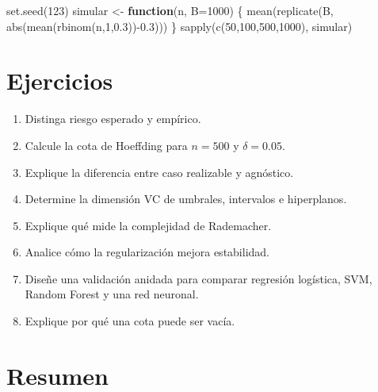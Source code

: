 \documentclass[
  spanish,
  10.5pt,
  letterpaper,
  DIV=11,
  numbers=noendperiod,
  oneside,
  open=any]{scrreprt}
\newenvironment{Shaded}{\begin{snugshade}}{\end{snugshade}}
\newcommand{\AttributeTok}[1]{\textcolor[rgb]{0.40,0.45,0.13}{#1}}
\newcommand{\ControlFlowTok}[1]{\textcolor[rgb]{0.00,0.23,0.31}{\textbf{#1}}}
\newcommand{\DecValTok}[1]{\textcolor[rgb]{0.68,0.00,0.00}{#1}}
\newcommand{\FloatTok}[1]{\textcolor[rgb]{0.68,0.00,0.00}{#1}}
\newcommand{\FunctionTok}[1]{\textcolor[rgb]{0.28,0.35,0.67}{#1}}
\newcommand{\NormalTok}[1]{\textcolor[rgb]{0.00,0.23,0.31}{#1}}
\newcommand{\OtherTok}[1]{\textcolor[rgb]{0.00,0.23,0.31}{#1}}
\newcommand{\SpecialCharTok}[1]{\textcolor[rgb]{0.37,0.37,0.37}{#1}}
\providecommand{\tightlist}{%
  \setlength{\itemsep}{0pt}\setlength{\parskip}{0pt}}
\theoremstyle{definition}
\theoremstyle{definition}
\theoremstyle{plain}
\theoremstyle{remark}
\begin{document}
\begin{Shaded}
\begin{Highlighting}[numbers=left,,]
\FunctionTok{set.seed}\NormalTok{(}\DecValTok{123}\NormalTok{)}
\NormalTok{simular }\OtherTok{\textless{}{-}} \ControlFlowTok{function}\NormalTok{(n, }\AttributeTok{B=}\DecValTok{1000}\NormalTok{) \{}
  \FunctionTok{mean}\NormalTok{(}\FunctionTok{replicate}\NormalTok{(B, }\FunctionTok{abs}\NormalTok{(}\FunctionTok{mean}\NormalTok{(}\FunctionTok{rbinom}\NormalTok{(n,}\DecValTok{1}\NormalTok{,}\FloatTok{0.3}\NormalTok{))}\SpecialCharTok{{-}}\FloatTok{0.3}\NormalTok{)))}
\NormalTok{\}}
\FunctionTok{sapply}\NormalTok{(}\FunctionTok{c}\NormalTok{(}\DecValTok{50}\NormalTok{,}\DecValTok{100}\NormalTok{,}\DecValTok{500}\NormalTok{,}\DecValTok{1000}\NormalTok{), simular)}
\end{Highlighting}
\end{Shaded}

\section*{Ejercicios}\label{ejercicios-1}


\begin{enumerate}
\def\labelenumi{\arabic{enumi}.}
\tightlist
\item
  Distinga riesgo esperado y empírico.
\item
  Calcule la cota de Hoeffding para \(n=500\) y \(\delta=0.05\).
\item
  Explique la diferencia entre caso realizable y agnóstico.
\item
  Determine la dimensión VC de umbrales, intervalos e hiperplanos.
\item
  Explique qué mide la complejidad de Rademacher.
\item
  Analice cómo la regularización mejora estabilidad.
\item
  Diseñe una validación anidada para comparar regresión logística, SVM,
  Random Forest y una red neuronal.
\item
  Explique por qué una cota puede ser vacía.
\end{enumerate}

\section*{Resumen}\label{resumen-19}
\end{document}
